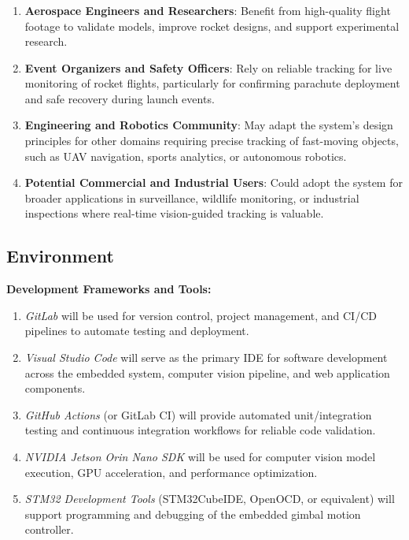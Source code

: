 \documentclass{article}
\begin{document}
\subsubsection*{\color{blue}{Indirect Stakeholders}}
\begin{enumerate}
    \item \textbf{Aerospace Engineers and Researchers}: Benefit from high-quality flight footage to validate models, improve rocket designs, and support experimental research.  

    \item \textbf{Event Organizers and Safety Officers}: Rely on reliable tracking for live monitoring of rocket flights, particularly for confirming parachute deployment and safe recovery during launch events.  

    \item \textbf{Engineering and Robotics Community}: May adapt the system’s design principles for other domains requiring precise tracking of fast-moving objects, such as UAV navigation, sports analytics, or autonomous robotics.  

    \item \textbf{Potential Commercial and Industrial Users}: Could adopt the system for broader applications in surveillance, wildlife monitoring, or industrial inspections where real-time vision-guided tracking is valuable.  
\end{enumerate}


\subsection{Environment}
\textbf{Development Frameworks and Tools:}
\begin{enumerate}

    \item \textit{GitLab} will be used for version control, project management, and CI/CD pipelines to automate testing and deployment.
    
    \item \textit{Visual Studio Code} will serve as the primary IDE for software development across the embedded system, computer vision pipeline, and web application components.  

    \item \textit{GitHub Actions} (or GitLab CI) will provide automated unit/integration testing and continuous integration workflows for reliable code validation.  

    \item \textit{NVIDIA Jetson Orin Nano SDK} will be used for computer vision model execution, GPU acceleration, and performance optimization.  

    \item \textit{STM32 Development Tools} (STM32CubeIDE, OpenOCD, or equivalent) will support programming and debugging of the embedded gimbal motion controller.  

\end{enumerate}
\end{document}

